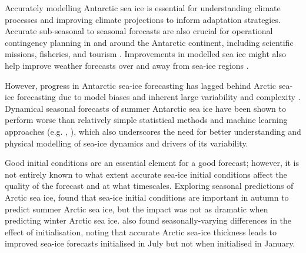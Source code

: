 \documentclass[tc, manuscript]{copernicus}
\begin{document}
Accurately modelling Antarctic sea ice is essential for understanding
climate processes and improving climate projections to inform adaptation
strategies. Accurate sub-seasonal to seasonal forecasts are also crucial
for operational contingency planning in and around the Antarctic
continent, including scientific missions, fisheries, and tourism
\citep{desilva2020, wagner2020}. Improvements in modelled sea ice might
also help improve weather forecasts over and away from sea-ice regions
\citep{rinke2006, wang2024, semmler2016}.

However, progress in Antarctic sea-ice forecasting has lagged behind
Arctic sea-ice forecasting due to model biases and inherent large
variability and complexity \citep{zampieri2019, gao2024}. Dynamical
seasonal forecasts of summer Antarctic sea ice have been shown to
perform worse than relatively simple statistical methods
\citep{massonnet2023} and machine learning approaches (e.g.
\citet{dong2024}, \citet{lin2025}), which also underscores the need for
better understanding and physical modelling of sea-ice dynamics and
drivers of its variability.

Good initial conditions are an essential element for a good forecast;
however, it is not entirely known to what extent accurate sea-ice
initial conditions affect the quality of the forecast and at what
timescales. Exploring seasonal predictions of Arctic sea ice,
\citet{guemas2016} found that sea-ice initial conditions are important
in autumn to predict summer Arctic sea ice, but the impact was not as
dramatic when predicting winter Arctic sea ice. \citet{day2014} also
found seasonally-varying differences in the effect of initialisation,
noting that accurate Arctic sea-ice thickness leads to improved sea-ice
forecasts initialised in July but not when initialised in January.
\end{document}
